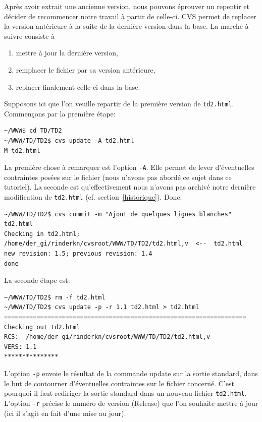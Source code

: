 \documentclass[11pt,a4paper]{article}
\begin{document}
Après avoir extrait une ancienne version, nous pouvons éprouver un
repentir et décider de recommencer notre travail à partir de
celle-ci. CVS permet de replacer la version antérieure à la suite de
la dernière version dans la base. La marche à suivre consiste à

\begin{enumerate}

  \item mettre à jour la dernière version,

  \item remplacer le fichier par sa version antérieure,

  \item replacer finalement celle-ci dans la base.

\end{enumerate}

\noindent Supposons ici que l'on veuille repartir de la première
version de \texttt{td2.html}. Commençons par la première étape:

{\small
\begin{verbatim}
~/WWW$ cd TD/TD2
~/WWW/TD/TD2$ cvs update -A td2.html
M td2.html
\end{verbatim}
}

La première chose à remarquer est l'option \texttt{-A}. Elle permet de
lever d'éventuelles contraintes posées sur le fichier (nous n'avons
pas abordé ce sujet dans ce tutoriel). La seconde est qu'effectivement
nous n'avons pas archivé notre dernière modification de
\texttt{td2.html} (cf. section~\ref{historique}). Donc:

{\small
\begin{verbatim}
~/WWW/TD/TD2$ cvs commit -m "Ajout de quelques lignes blanches" td2.html
Checking in td2.html;
/home/der_gi/rinderkn/cvsroot/WWW/TD/TD2/td2.html,v  <--  td2.html
new revision: 1.5; previous revision: 1.4
done
\end{verbatim}
}

\noindent La seconde étape est:

{\small
\begin{verbatim}
~/WWW/TD/TD2$ rm -f td2.html
~/WWW/TD/TD2$ cvs update -p -r 1.1 td2.html > td2.html
===================================================================
Checking out td2.html
RCS:  /home/der_gi/rinderkn/cvsroot/WWW/TD/TD2/td2.html,v
VERS: 1.1
***************
\end{verbatim}
}

\noindent L'option \texttt{-p} envoie le résultat de la commande
\textsf{update} sur la sortie standard, dans le but de contourner
d'éventuelles contraintes sur le fichier concerné. C'est pourquoi il
faut rediriger la sortie standard dans un nouveau fichier
\texttt{td2.html}. L'option \texttt{-r} précise le numéro de version
(\textsf{Release}) que l'on souhaite mettre à jour (ici il s'agit en
fait d'une mise au jour).
\end{document}
